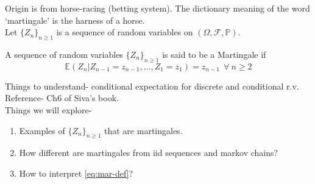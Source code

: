 \documentclass[main]{subfiles}
\begin{document}


Origin is from horse-racing (betting system). The dictionary meaning of the word `martingale' is the harness of a horse. \\
Let $\{Z_n\}_{n \geq 1}$ is a sequence of random variables on $(\Omega, \mathcal{F}, \mathbb{P})$. \\
\begin{definition} A sequence of random variables $\{Z_n\}_{n \geq 1}$ is said to be a Martingale if
  \begin{equation} \label{eq:mar-def}
    \mathbb{E} (Z_{n}|Z_{n-1}=z_{n-1}, \ldots, Z_1=z_1 )= z_{n-1} ~~\forall ~ n \geq 2
  \end{equation} \end{definition}

Things to understand- conditional expectation for discrete and conditional r.v. Reference- Ch6 of Siva's book.\\
Things we will explore-
\begin{enumerate}
  \item Examples of $\{Z_n\}_{n \geq 1}$ that are martingales.\\
  \item How different are martingales from iid sequences and markov chains? \\
  \item How to interpret \ref{eq:mar-def}?
\end{enumerate}
\end{document}
